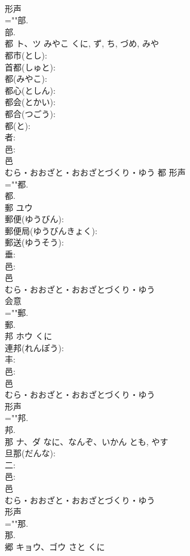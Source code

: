 \documentclass[8pt]{extreport}
\begin{document}
\begin{CJK}{UTF8}{min}
\\	形声 
\\	=""部.
\\	部.
\\	都	ト、ツ	みやこ	くに, ず, ち, づめ, みや	
\\	都市(とし): 
\\	首都(しゅと): 
\\	都(みやこ): 
\\	都心(としん): 
\\	都会(とかい): 
\\	都合(つごう): 
\\	都(と): 
\\	者: 
\\	邑: 
\\	邑	
\\	むら・おおざと・おおざとづくり・ゆう	都	形声 
\\	=""都.
\\	都.
\\	郵	ユウ			
\\	郵便(ゆうびん): 
\\	郵便局(ゆうびんきょく): 
\\	郵送(ゆうそう): 
\\	垂: 
\\	邑: 
\\	邑	
\\	むら・おおざと・おおざとづくり・ゆう	
\\	会意 
\\	=""郵.
\\	郵.
\\	邦	ホウ	くに		
\\	連邦(れんぽう): 
\\	丰: 
\\	邑: 
\\	邑	
\\	むら・おおざと・おおざとづくり・ゆう	
\\	形声 
\\	=""邦.
\\	邦.
\\	那	ナ、ダ	なに、なんぞ、いかん	とも, やす	
\\	旦那(だんな): 
\\	二: 
\\	邑: 
\\	邑	
\\	むら・おおざと・おおざとづくり・ゆう	
\\	形声 
\\	=""那.
\\	那.
\\	郷	キョウ、ゴウ	さと	くに	

\end{CJK}
\end{document}
